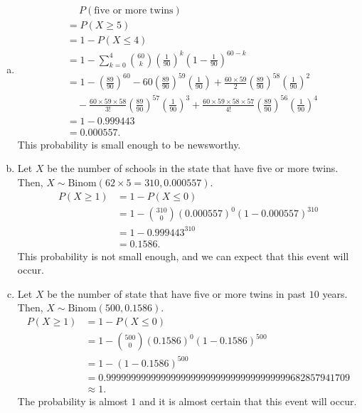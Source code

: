 \documentclass[14pt]{elegantbook}
\begin{document}
    \begin{solution}
        \begin{enumerate}[(a)]
            \item \begin{align*}
                &\quad\ P(\text{five or more twins})\\
                &=P(X\geq 5)\\
                &=1-P(X\leq 4)\\
                &=1-\sum_{k=0}^4\binom{60}{k}\left(\frac{1}{90}\right)^k\left(1-\frac{1}{90}\right)^{60-k}\\
                &=1-\left(\frac{89}{90}\right)^{60}-60\left(\frac{89}{90}\right)^{59}\left(\frac{1}{90}\right)+\frac{60\times59}{2}\left(\frac{89}{90}\right)^{58}\left(\frac{1}{90}\right)^2\\
                &\quad -\frac{60\times59\times58}{3!}\left(\frac{89}{90}\right)^{57}\left(\frac{1}{90}\right)^3+\frac{60\times59\times58\times57}{4!}\left(\frac{89}{90}\right)^{56}\left(\frac{1}{90}\right)^4\\
                &=1-0.999443\\
                &=0.000557. 
            \end{align*}
            This probability is small enough to be newsworthy. 
            \item Let $X$ be the number of schools in the state that have five or more twins. Then, $X\sim\text{Binom}(62\times 5=310, 0.000557)$. 
            \begin{align*}
                P(X\geq 1)&=1-P(X\leq 0)\\
                &=1-\binom{310}{0}\left(0.000557\right)^0\left(1-0.000557\right)^{310}\\
                &=1-0.999443^{310}\\
                &=0.1586. 
            \end{align*}
            This probability is not small enough, and we can expect that this event will occur. 
            \item Let $X$ be the number of state that have five or more twins in past $10$ years. Then, $X\sim\text{Binom}(500, 0.1586)$. 
            \begin{align*}
                P(X\geq 1)&=1-P(X\leq 0)\\
                &=1-\binom{500}{0}\left(0.1586\right)^0\left(1-0.1586\right)^{500}\\
                &=1-(1-0.1586)^{500}\\
                &=0.9999999999999999999999999999999999999682857941709\\
                &\approx 1.
            \end{align*}
            The probability is almost $1$ and it is almost certain that this event will occur.
        \end{enumerate}
    \end{solution}
\end{document}
